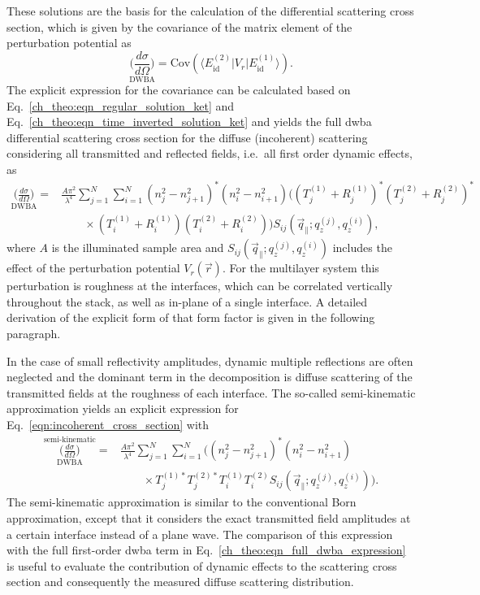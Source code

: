 These solutions are the basis for the calculation of the differential scattering cross section, which is given by the covariance of the matrix element of the perturbation potential \cite{pietsch_high-resolution_2004} as
\begin{equation}
        \underset{\text{DWBA}}{\Big(\frac{d \sigma}{d \Omega}\Big)}= \text{Cov}(\langle E_{\text{id}}^{(2)}| V_r|E_{\text{id}}^{(1)}\rangle)\text{.} \label{eqn:incoherent_cross_section} 
\end{equation}
The explicit expression for the covariance can be calculated based on Eq.~\eqref{ch_theo:eqn_regular_solution_ket} and Eq.~\eqref{ch_theo:eqn_time_inverted_solution_ket} and yields the full \gls{dwba} differential scattering cross section for the diffuse (incoherent) scattering considering all transmitted and reflected fields, i.e.~all first order dynamic effects, as
\begin{align}
        {\underset{\text{DWBA}}{\Big(\frac{d \sigma}{d \Omega}\Big)}} = &\frac{A \pi^2}{\lambda^4}\sum \limits_{j=1}^{N}\sum \limits_{i=1}^{N} (n_j^2 - n_{j+1}^2)^* (n_i^2 - n_{i+1}^2)\Big( (T^{(1)}_j + R^{(1)}_j)^* (T^{(2)}_j + R^{(2)}_j)^* \nonumber \\ &\qquad\times(T^{(1)}_i + R^{(1)}_i) (T^{(2)}_i + R^{(2)}_i) \Big)  S_{ij}(\vec{q}_\parallel; q_z^{(j)}, q_z^{(i)}) \text{,} \label{ch_theo:eqn_full_dwba_expression}
\end{align}
where $A$ is the illuminated sample area and $S_{ij}(\vec{q}_\parallel; q_z^{(j)}, q_z^{(i)})$ includes the effect of the perturbation potential $V_r(\vec{r})$. For the multilayer system this perturbation is roughness at the interfaces, which can be correlated vertically throughout the stack, as well as in-plane of a single interface. A detailed derivation of the explicit form of that form factor is given in the following paragraph.

In the case of small reflectivity amplitudes, dynamic multiple reflections are often neglected and the dominant term in the decomposition is diffuse scattering of the transmitted fields at the roughness of each interface. The so-called semi-kinematic approximation \cite{sinha_x-ray_1988} yields an explicit expression for Eq.~\eqref{eqn:incoherent_cross_section} with
\begin{align}
                \overset{\text{semi-kinematic}}{\underset{\text{DWBA}}{\Big(\frac{d \sigma}{d \Omega}\Big)}} = &\frac{A \pi^2}{\lambda^4}\sum \limits_{j=1}^{N}\sum \limits_{i=1}^{N} \Big((n_j^2 - n_{j+1}^2)^* (n_i^2 - n_{i+1}^2) \nonumber \\ &\qquad\times T^{(1)*}_j T^{(2)*}_j T^{(1)}_i T^{(2)}_i S_{ij}(\vec{q}_\parallel; q_z^{(j)}, q_z^{(i)})\Big)\text{.} \label{ch_theo:eqn_semi_kinematic_dwba_expression} 
\end{align}
The semi-kinematic approximation is similar to the conventional Born approximation, except that it considers the exact transmitted field amplitudes at a certain interface instead of a plane wave. The comparison of this expression with the full first-order \gls{dwba} term in Eq.~\eqref{ch_theo:eqn_full_dwba_expression} is useful to evaluate the contribution of dynamic effects to the scattering cross section and consequently the measured diffuse scattering distribution.

